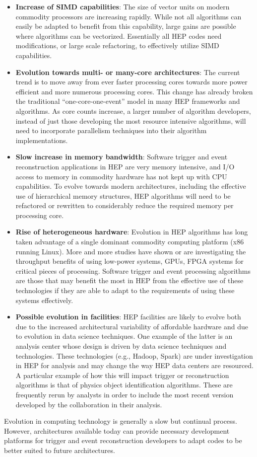 \begin{itemize}
\item
{\bf Increase of SIMD capabilities}: The size of vector units on modern commodity processors are increasing rapidly. While not all algorithms can easily be adapted to benefit from this capability, 
large gains are possible where algorithms can be vectorized. Essentially all HEP codes need modifications, or large scale refactoring, to effectively utilize SIMD capabilities.
\item
{\bf Evolution towards multi- or many-core architectures}: The current trend is to move away from ever faster processing cores towards more power efficient and more numerous processing cores. This 
change has already broken the traditional ``one-core-one-event'' model in many HEP frameworks and algorithms. As core counts increase, a larger number of algorithm developers, instead of just those 
developing the most resource intensive algorithms, will need to incorporate parallelism techniques into their algorithm implementations.   
\item
{\bf Slow increase in memory bandwidth}: Software trigger and event reconstruction applications in HEP are very memory intensive, and I/O access to memory in commodity hardware has not kept up with 
CPU capabilities. To evolve towards modern architectures, including the effective use of hierarchical memory structures, HEP algorithms will need to be refactored or rewritten to considerably reduce 
the required memory per processing core. 
\item
{\bf Rise of heterogeneous hardware}: Evolution in HEP algorithms has long taken advantage of a single dominant commodity computing platform (x86 running Linux).  More and more studies have shown 
or are investigating the throughput benefits of using low-power systems, GPUs, FPGA systems for critical pieces of processing. Software trigger and event processing algorithms are those that may 
benefit the most in HEP from the effective use of these technologies if they are able to adapt to the requirements of using these systems effectively.
\item
{\bf Possible evolution in facilities}: HEP facilities are likely to evolve both due to the increased architectural variability of affordable hardware and due to evolution in data science techniques. 
One example of the latter is an analysis center whose design is driven by data science techniques and technologies. These technologies (e.g., Hadoop, Spark) are under investigation in HEP for analysis 
and may change the way HEP data centers are resourced. A particular example of how this will impact trigger or reconstruction algorithms is that of physics object identification algorithms. These 
are frequently rerun by analysts in order to include the most recent version developed by the collaboration in their analysis.
\end{itemize}
Evolution in computing technology is generally a slow but continual process. However, architectures available today can provide necessary development platforms for trigger and event reconstruction 
developers to adapt codes to be better suited to future architectures.

